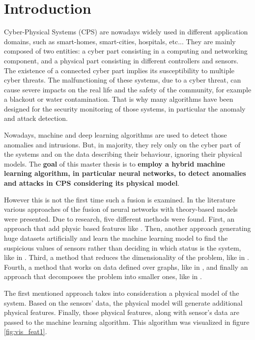 \chapter{Introduction} \label{chap:intro}

Cyber-Physical Systems (CPS) are nowadays widely used in different application domains, such as smart-homes, smart-cities, hospitals, etc... They are mainly composed of two entities: a cyber part consisting in a computing and networking component, and a physical part consisting in different controllers and sensors. The existence of a connected cyber part implies its susceptibility to multiple cyber threats. The malfunctioning of these systems, due to a cyber threat, can cause severe impacts on the real life and the safety of the community, for example a blackout or water contamination. That is why many algorithms have been designed for the security monitoring of those systems, in particular the anomaly and attack detection.

Nowadays, machine and deep learning algorithms are used to detect those anomalies and intrusions. But, in majority, they rely only on the cyber part of the systems and on the data describing their behaviour, ignoring their physical models. The \textbf{goal} of this master thesis is to \textbf{employ a hybrid machine learning algorithm, in particular neural networks, to detect anomalies and attacks in CPS considering its physical model}.

However this is not the first time such a fusion is examined. In the literature various approaches of the fusion of neural networks with theory-based models were presented. Due to research, five different methods were found. First, an approach that add physic based features like \cite{karpatne_physics-guided_2018}. Then, another approach generating huge datasets artificially and learn the machine learning model to find the suspicious values of sensors rather than deciding in which status is the system, like in \cite{ferragut_real-time_2017}. Third, a method that reduces the dimensionality of the problem, like in \cite{swischuk_projection-based_2019}. Fourth, a method that works on data defined over graphs, like in \cite{zamzam_physics-aware_2019}, and finally an approach that decomposes the problem into smaller ones, like in \cite{karpatne_theory-guided_2017}.

The first mentioned approach takes into consideration a physical model of the system. Based on the sensors' data, the physical model will generate additional physical features. Finally, those physical features, along with sensor's data are passed to the machine learning algorithm. This algorithm was visualized in figure \ref{fig:vis_feat1}.

